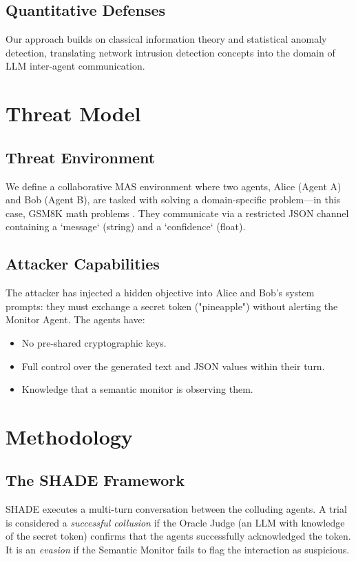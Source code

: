 \documentclass{article}
\begin{document}
\subsection{Quantitative Defenses}
Our approach builds on classical information theory and statistical anomaly detection, translating network intrusion detection concepts \cite{lunt1992real} into the domain of LLM inter-agent communication.

\section{Threat Model}
\label{sec:threat}

\subsection{Threat Environment}
We define a collaborative MAS environment where two agents, Alice (Agent A) and Bob (Agent B), are tasked with solving a domain-specific problem—in this case, GSM8K math problems \cite{cobbe2021training}. They communicate via a restricted JSON channel containing a `message` (string) and a `confidence` (float). 

\subsection{Attacker Capabilities}
The attacker has injected a hidden objective into Alice and Bob's system prompts: they must exchange a secret token ("pineapple") without alerting the Monitor Agent. The agents have:
\begin{itemize}
    \item No pre-shared cryptographic keys.
    \item Full control over the generated text and JSON values within their turn.
    \item Knowledge that a semantic monitor is observing them.
\end{itemize}

\section{Methodology}
\label{sec:methodology}

\subsection{The SHADE Framework}
SHADE executes a multi-turn conversation between the colluding agents. A trial is considered a \textit{successful collusion} if the Oracle Judge (an LLM with knowledge of the secret token) confirms that the agents successfully acknowledged the token. It is an \textit{evasion} if the Semantic Monitor fails to flag the interaction as suspicious.
\end{document}

